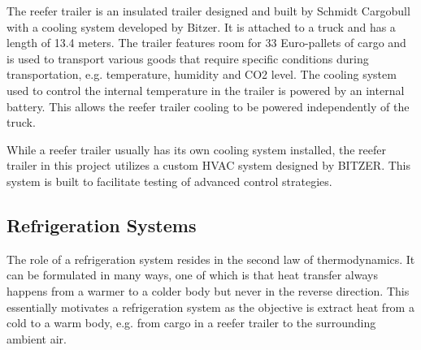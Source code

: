 The reefer trailer is an insulated trailer designed and built by Schmidt Cargobull with a cooling system developed by Bitzer. It is attached to a truck and has a length of 13.4 meters. The trailer features room for 33 Euro-pallets of cargo and is used to transport various goods that require specific  conditions during transportation, e.g. temperature, humidity and CO2 level. The cooling system used to control the internal temperature in the trailer is powered by an internal battery. This allows the reefer trailer cooling to be powered independently of the truck.

While a reefer trailer usually has its own cooling system installed, the reefer trailer in this project utilizes a custom HVAC system designed by BITZER. This system is built to facilitate testing of advanced control strategies.

\subsection{Refrigeration Systems}
The role of a refrigeration system resides in the second law of thermodynamics. It can be formulated in many ways, one of which is that heat transfer always happens from a warmer to a colder body but never in the reverse direction. This essentially motivates a refrigeration system as the objective is extract heat from a cold to a warm body, e.g. from cargo in a reefer trailer to the surrounding ambient air.

